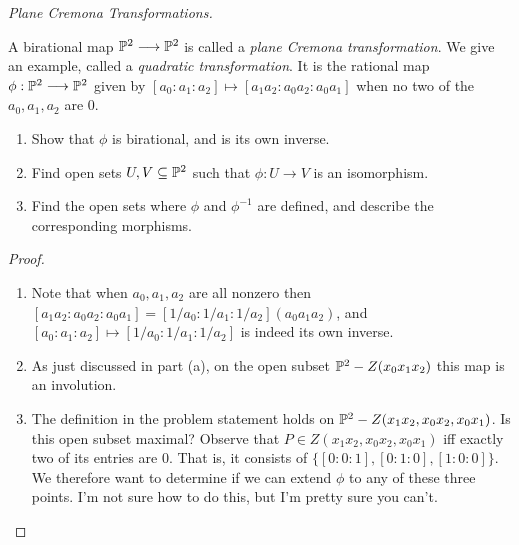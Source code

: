 \label{1.4.6}

\emph{Plane Cremona Transformations.}

A birational map $\P^2 \longrightarrow \P^2$ is called a \emph{plane Cremona transformation}. We give an example, called a \emph{quadratic transformation}. It is the rational map $\phi: \P^2 \longrightarrow \P^2$ given by $[a_0 : a_1 : a_2] \mapsto [a_1 a_2 : a_0 a_2 : a_0 a_1]$ when no two of the $a_0, a_1, a_2$ are $0$.

\begin{enumerate}[label = (\alph*)]
    \item Show that $\phi$ is birational, and is its own inverse.

    \item Find open sets $U, V \subseteq \P^2$ such that $\phi: U \longrightarrow V$ is an isomorphism.

    \item Find the open sets where $\phi$ and $\phi^{-1}$ are defined, and describe the corresponding morphisms.
\end{enumerate}


\begin{proof}
    \begin{enumerate}[label = (\alph*)]
        \item Note that when $a_0, a_1, a_2$ are all nonzero then $[a_1 a_2 : a_0 a_2 : a_0 a_1] = [1/a_0 : 1/a_1 : 1/a_2] (a_0 a_1 a_2)$, and $[a_0 : a_1 : a_2] \mapsto [1/a_0 : 1/a_1 : 1/a_2]$ is indeed its own inverse.

        \item As just discussed in part (a), on the open subset $\P^2 - Z(x_0 x_1 x_2)$ this map is an involution.

        \item The definition in the problem statement holds on $\P^2 - Z(x_1 x_2, x_0 x_2, x_0 x_1)$. Is this open subset maximal? Observe that $P \in Z(x_1 x_2, x_0 x_2, x_0 x_1)$ iff exactly two of its entries are $0$. That is, it consists of $\{[0 : 0 : 1], [0 : 1 : 0], [1 : 0 : 0]\}$. We therefore want to determine if we can extend $\phi$ to any of these three points. I'm not sure how to do this, but I'm pretty sure you can't.
    \end{enumerate}
\end{proof}
